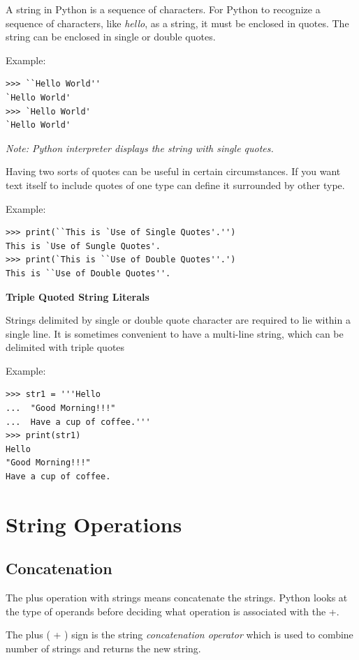 \documentclass[11pt,a4paper]{article}
\author{TalentSprint}
\date{}
\begin{document}
A string in Python is a sequence of characters. For Python to recognize a sequence of characters, like \emph{hello}, as a string, it must be enclosed in quotes. The string can be enclosed in single or double quotes.

Example:
\begin{verbatim}
>>> ``Hello World''
`Hello World'
>>> `Hello World'
`Hello World'
\end{verbatim}

\emph{Note: Python interpreter displays the string with single quotes.}

Having two sorts of quotes can be useful in certain circumstances. If you want text itself to include quotes of one type can define it surrounded by other type.

Example:
\begin{verbatim}
>>> print(``This is `Use of Single Quotes'.'')
This is `Use of Sungle Quotes'.
>>> print(`This is ``Use of Double Quotes''.')
This is ``Use of Double Quotes''.
\end{verbatim}


\textbf{Triple Quoted String Literals}

Strings delimited by single or double quote character are required to lie within a single line. It is sometimes convenient to have a multi-line string, which can be delimited with triple quotes

Example:
\begin{verbatim}
>>> str1 = '''Hello
...  "Good Morning!!!"
...  Have a cup of coffee.'''
>>> print(str1)
Hello
"Good Morning!!!"
Have a cup of coffee.
\end{verbatim}
\section*{String Operations}
\subsection*{Concatenation}

The plus operation with strings means concatenate the strings. Python looks at the type of operands before
deciding what operation is associated with the +.

The plus ( + ) sign is the string \emph{concatenation operator} which is used to combine number of strings and returns the new string.
\end{document}
